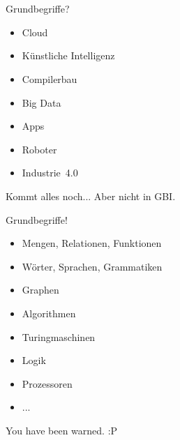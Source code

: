 




\graphicspath{{../figures/}}



\aboutMeFrame

\section{}

\begin{frame}{Grundbegriffe?}
	\begin{itemize}
		\item Cloud
		\item Künstliche Intelligenz
		\item Compilerbau
		\item Big Data
		\item Apps
		\item Roboter
		\item Industrie~4.0
	\end{itemize}

	\pause
	Kommt alles noch... Aber nicht in GBI.
\end{frame}

\begin{frame}{Grundbegriffe!}
	\begin{itemize}
		\item Mengen, Relationen, Funktionen
		\item Wörter, Sprachen, Grammatiken
		\item Graphen
		\item Algorithmen
		\item Turingmaschinen
		\item Logik
		\item Prozessoren
		\item ...
	\end{itemize}
	\impl You have been warned. :P
\end{frame}

